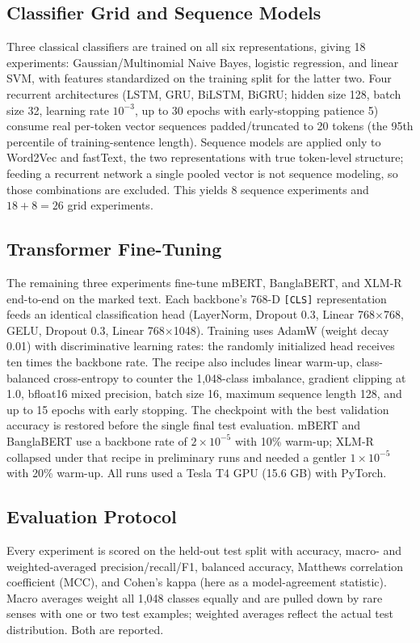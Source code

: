 \documentclass[conference]{IEEEtran}
\begin{document}
\subsection{Classifier Grid and Sequence Models}
Three classical classifiers are trained on all six representations, giving 18 experiments: Gaussian/Multinomial Naive Bayes, logistic regression, and linear SVM, with features standardized on the training split for the latter two. Four recurrent architectures (LSTM, GRU, BiLSTM, BiGRU; hidden size 128, batch size 32, learning rate $10^{-3}$, up to 30 epochs with early-stopping patience 5) consume real per-token vector sequences padded/truncated to 20 tokens (the 95th percentile of training-sentence length). Sequence models are applied only to Word2Vec and fastText, the two representations with true token-level structure; feeding a recurrent network a single pooled vector is not sequence modeling, so those combinations are excluded. This yields 8 sequence experiments and $18 + 8 = 26$ grid experiments.

\subsection{Transformer Fine-Tuning}
The remaining three experiments fine-tune mBERT, BanglaBERT, and XLM-R end-to-end on the marked text. Each backbone's 768-D \texttt{[CLS]} representation feeds an identical classification head (LayerNorm, Dropout 0.3, Linear 768$\times$768, GELU, Dropout 0.3, Linear 768$\times$1048). Training uses AdamW (weight decay 0.01) with discriminative learning rates: the randomly initialized head receives ten times the backbone rate. The recipe also includes linear warm-up, class-balanced cross-entropy to counter the 1,048-class imbalance, gradient clipping at 1.0, bfloat16 mixed precision, batch size 16, maximum sequence length 128, and up to 15 epochs with early stopping. The checkpoint with the best validation accuracy is restored before the single final test evaluation. mBERT and BanglaBERT use a backbone rate of $2\times10^{-5}$ with 10\% warm-up; XLM-R collapsed under that recipe in preliminary runs and needed a gentler $1\times10^{-5}$ with 20\% warm-up. All runs used a Tesla T4 GPU (15.6 GB) with PyTorch.

\subsection{Evaluation Protocol}
Every experiment is scored on the held-out test split with accuracy, macro- and weighted-averaged precision/recall/F1, balanced accuracy, Matthews correlation coefficient (MCC), and Cohen's kappa (here as a model-agreement statistic). Macro averages weight all 1,048 classes equally and are pulled down by rare senses with one or two test examples; weighted averages reflect the actual test distribution. Both are reported.
\end{document}
